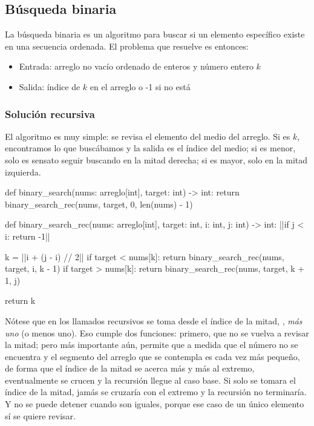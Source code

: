 \subsection{Búsqueda binaria}

La búsqueda binaria es un algoritmo para buscar si un elemento específico existe en una secuencia ordenada. El problema que resuelve es entonces:
\begin{itemize}
  \item Entrada: arreglo no vacío ordenado de enteros y número entero \(k\)
  \item Salida: índice de \(k\) en el arreglo o -1 si no está
\end{itemize}

\subsubsection{Solución recursiva}

El algoritmo es muy simple: se revisa el elemento del medio del arreglo. Si es \(k\), encontramos lo que buscábamos y la salida es el índice del medio; si es menor, solo es sensato seguir buscando en la mitad derecha; si es mayor, solo en la mitad izquierda.

\begin{pseudocode}
def binary_search(nums: arreglo[int], target: int) -> int:
    return binary_search_rec(nums, target, 0, len(nums) - 1)

def binary_search_rec(nums: arreglo[int], target: int, i: int, j: int) -> int:
    ||if j < i:
        return -1||

    k = ||i + (j - i) // 2||
    if target < nums[k]:
        return binary_search_rec(nums, target, i, k - 1)
    if target > nums[k]:
        return binary_search_rec(nums, target, k + 1, j)

    return k
\end{pseudocode}
\begin{annotations}
\end{annotations}

Nótese que en los llamados recursivos se toma desde el índice de la mitad, , \textit{más uno} (o menos uno). Eso cumple dos funciones: primero, que no se vuelva a revisar la mitad; pero más importante aún, permite que a medida que el número no se encuentra y el segmento del arreglo que se contempla es cada vez más pequeño, de forma que el índice de la mitad se acerca más y más al extremo, eventualmente se crucen y la recursión llegue al caso base. Si solo se tomara el índice de la mitad, jamás se cruzaría con el extremo y la recursión no terminaría. Y no se puede detener cuando son iguales, porque ese caso de un único elemento sí se quiere revisar.

